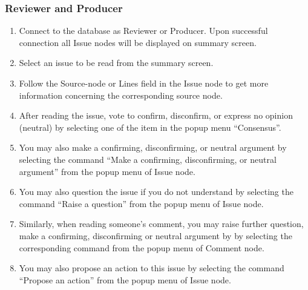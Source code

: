 \subsubsection*{Reviewer and Producer}
\begin{enumerate}
\item Connect to the database as Reviewer or Producer. Upon successful
connection all Issue nodes will be displayed on summary screen.
\item Select an issue to be read from the summary screen.
\item Follow the Source-node or Lines field in the Issue
node to get more information concerning the corresponding source node.
\item After reading the issue, vote to confirm, disconfirm, or express no
opinion (neutral) by selecting one of the item in the popup menu
``Consensus''. 
\item You may also make a confirming, disconfirming, or neutral
argument by selecting the command ``Make a confirming, disconfirming,
or neutral argument'' from the popup menu of Issue node. 
\item You may also question the issue if you do not understand by
selecting the command ``Raise a question'' from the popup menu of Issue node.

\item Similarly, when reading someone's comment, you may raise further
question, make a confirming, disconfirming or neutral argument by 
by selecting the corresponding command from the popup menu of Comment node.

\item You may also propose an action to this issue by selecting the
command ``Propose an action'' from the popup menu of Issue node.


\end{enumerate}
